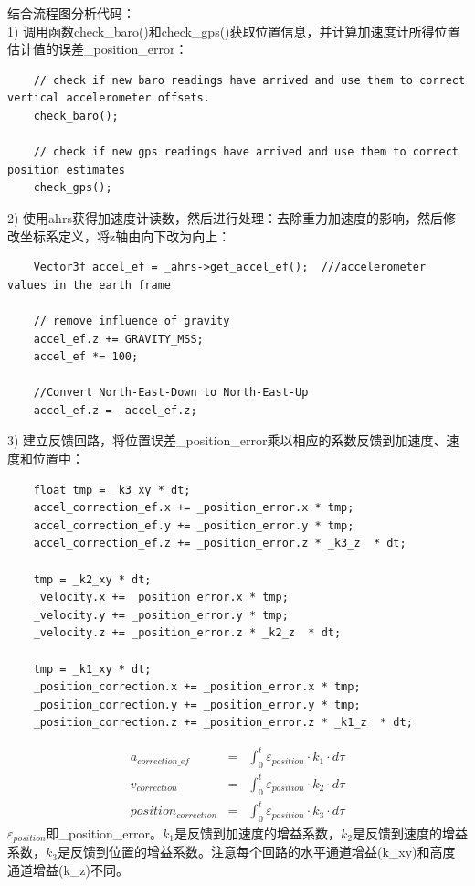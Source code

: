 \documentclass[a4paper,10pt]{ctexart} %
\begin{document}
结合流程图分析代码：\\
1) 调用函数check\_baro()和check\_gps()获取位置信息，并计算加速度计所得位置估计值的误差\_position\_error：
\begin{lstlisting}
    // check if new baro readings have arrived and use them to correct vertical accelerometer offsets.
    check_baro();

    // check if new gps readings have arrived and use them to correct position estimates
    check_gps();
\end{lstlisting}
2) 使用ahrs获得加速度计读数，然后进行处理：去除重力加速度的影响，然后修改坐标系定义，将z轴由向下改为向上：
\begin{lstlisting}
    Vector3f accel_ef = _ahrs->get_accel_ef();  ///accelerometer values in the earth frame

    // remove influence of gravity
    accel_ef.z += GRAVITY_MSS;
    accel_ef *= 100;

    //Convert North-East-Down to North-East-Up
    accel_ef.z = -accel_ef.z;
\end{lstlisting}
3) 建立反馈回路，将位置误差\_position\_error乘以相应的系数反馈到加速度、速度和位置中：
\begin{lstlisting}
    float tmp = _k3_xy * dt;
    accel_correction_ef.x += _position_error.x * tmp;
    accel_correction_ef.y += _position_error.y * tmp;
    accel_correction_ef.z += _position_error.z * _k3_z  * dt;

    tmp = _k2_xy * dt;
    _velocity.x += _position_error.x * tmp;
    _velocity.y += _position_error.y * tmp;
    _velocity.z += _position_error.z * _k2_z  * dt;

    tmp = _k1_xy * dt;
    _position_correction.x += _position_error.x * tmp;
    _position_correction.y += _position_error.y * tmp;
    _position_correction.z += _position_error.z * _k1_z  * dt;
\end{lstlisting}
\begin{eqnarray}
a_{correction\_ef}	  & = & \int_{0}^{t}{\varepsilon_{position}}\cdot k_{1}\cdot d\tau \\ \nonumber
v_{correction}		  & = & \int_{0}^{t}{\varepsilon_{position}}\cdot k_{2}\cdot d\tau \\ \nonumber
position_{correction} & = & \int_{0}^{t}{\varepsilon_{position}}\cdot k_{3}\cdot d\tau
\end{eqnarray}
$\varepsilon_{position}$即\_position\_error。$k_1$是反馈到加速度的增益系数，$k_2$是反馈到速度的增益系数，$k_3$是反馈到位置的增益系数。注意每个回路的水平通道增益(k\_xy)和高度通道增益(k\_z)不同。
\end{document}
